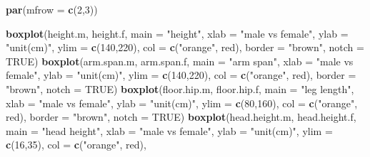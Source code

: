 \documentclass[]{article}
\newenvironment{Shaded}{\begin{snugshade}}{\end{snugshade}}
\newcommand{\DataTypeTok}[1]{\textcolor[rgb]{0.13,0.29,0.53}{#1}}
\newcommand{\DecValTok}[1]{\textcolor[rgb]{0.00,0.00,0.81}{#1}}
\newcommand{\KeywordTok}[1]{\textcolor[rgb]{0.13,0.29,0.53}{\textbf{#1}}}
\newcommand{\NormalTok}[1]{#1}
\newcommand{\OtherTok}[1]{\textcolor[rgb]{0.56,0.35,0.01}{#1}}
\newcommand{\StringTok}[1]{\textcolor[rgb]{0.31,0.60,0.02}{#1}}
\begin{document}
\begin{Shaded}
\begin{Highlighting}[]
\KeywordTok{par}\NormalTok{(}\DataTypeTok{mfrow =} \KeywordTok{c}\NormalTok{(}\DecValTok{2}\NormalTok{,}\DecValTok{3}\NormalTok{))}

\KeywordTok{boxplot}\NormalTok{(height.m, height.f,}
        \DataTypeTok{main =} \StringTok{"height"}\NormalTok{,}
        \DataTypeTok{xlab =} \StringTok{"male vs female"}\NormalTok{,}
        \DataTypeTok{ylab =} \StringTok{"unit(cm)"}\NormalTok{,}
        \DataTypeTok{ylim =} \KeywordTok{c}\NormalTok{(}\DecValTok{140}\NormalTok{,}\DecValTok{220}\NormalTok{),}
        \DataTypeTok{col =} \KeywordTok{c}\NormalTok{(}\StringTok{"orange"}\NormalTok{, }\StringTok{\textquotesingle{}red\textquotesingle{}}\NormalTok{),}
        \DataTypeTok{border =} \StringTok{"brown"}\NormalTok{,}
        \DataTypeTok{notch =} \OtherTok{TRUE}\NormalTok{)}
\KeywordTok{boxplot}\NormalTok{(arm.span.m, arm.span.f,}
        \DataTypeTok{main =} \StringTok{"arm span"}\NormalTok{,}
        \DataTypeTok{xlab =} \StringTok{"male vs female"}\NormalTok{,}
        \DataTypeTok{ylab =} \StringTok{"unit(cm)"}\NormalTok{,}
        \DataTypeTok{ylim =} \KeywordTok{c}\NormalTok{(}\DecValTok{140}\NormalTok{,}\DecValTok{220}\NormalTok{),}
        \DataTypeTok{col =} \KeywordTok{c}\NormalTok{(}\StringTok{"orange"}\NormalTok{, }\StringTok{\textquotesingle{}red\textquotesingle{}}\NormalTok{),}
        \DataTypeTok{border =} \StringTok{"brown"}\NormalTok{,}
        \DataTypeTok{notch =} \OtherTok{TRUE}\NormalTok{)}
\KeywordTok{boxplot}\NormalTok{(floor.hip.m, floor.hip.f,}
        \DataTypeTok{main =} \StringTok{"leg length"}\NormalTok{,}
        \DataTypeTok{xlab =} \StringTok{"male vs female"}\NormalTok{,}
        \DataTypeTok{ylab =} \StringTok{"unit(cm)"}\NormalTok{,}
        \DataTypeTok{ylim =} \KeywordTok{c}\NormalTok{(}\DecValTok{80}\NormalTok{,}\DecValTok{160}\NormalTok{),}
        \DataTypeTok{col =} \KeywordTok{c}\NormalTok{(}\StringTok{"orange"}\NormalTok{, }\StringTok{\textquotesingle{}red\textquotesingle{}}\NormalTok{),}
        \DataTypeTok{border =} \StringTok{"brown"}\NormalTok{,}
        \DataTypeTok{notch =} \OtherTok{TRUE}\NormalTok{)}
\KeywordTok{boxplot}\NormalTok{(head.height.m, head.height.f,}
        \DataTypeTok{main =} \StringTok{"head height"}\NormalTok{,}
        \DataTypeTok{xlab =} \StringTok{"male vs female"}\NormalTok{,}
        \DataTypeTok{ylab =} \StringTok{"unit(cm)"}\NormalTok{,}
        \DataTypeTok{ylim =} \KeywordTok{c}\NormalTok{(}\DecValTok{16}\NormalTok{,}\DecValTok{35}\NormalTok{),}
        \DataTypeTok{col =} \KeywordTok{c}\NormalTok{(}\StringTok{"orange"}\NormalTok{, }\StringTok{\textquotesingle{}red\textquotesingle{}}\NormalTok{),}

\end{Highlighting}
\end{Shaded}
\end{document}
